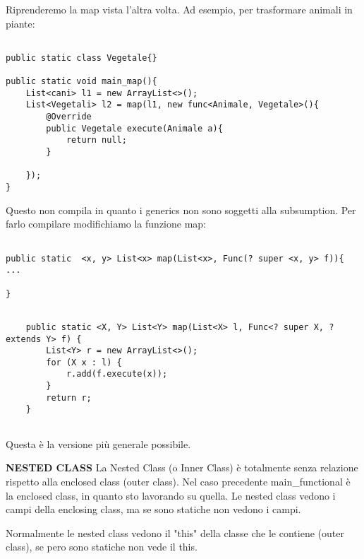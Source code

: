 \noindent Riprenderemo la map vista l'altra volta. Ad esempio, per trasformare animali in piante: 

\begin{lstlisting}[basicstyle=\small,]

public static class Vegetale{}

public static void main_map(){
	List<cani> l1 = new ArrayList<>();
	List<Vegetali> l2 = map(l1, new func<Animale, Vegetale>(){
		@Override
		public Vegetale execute(Animale a){
			return null;
		}
	
	});
}

\end{lstlisting}

\noindent Questo non compila in quanto i generics non sono soggetti alla subsumption. \newline
Per farlo compilare modifichiamo la funzione map: 

\begin{lstlisting}[basicstyle=\small,]

public static  <x, y> List<x> map(List<x>, Func(? super <x, y> f)){
...

}

\end{lstlisting}

\begin{lstlisting}[basicstyle=\small,]

    public static <X, Y> List<Y> map(List<X> l, Func<? super X, ? extends Y> f) {
        List<Y> r = new ArrayList<>();
        for (X x : l) {
            r.add(f.execute(x));
        }
        return r;
    }
    
\end{lstlisting}

Questa è la versione più generale possibile. \newline


\noindent \textbf{NESTED CLASS}\newline
La Nested Class (o Inner Class) è totalmente senza relazione rispetto alla enclosed class (outer class).\newline
Nel caso precedente main{\_}functional è la enclosed class, in quanto sto lavorando su quella. \newline
Le nested class vedono i campi della enclosing class, ma se sono statiche non vedono i campi. 


Normalmente le nested class vedono il "this" della classe che le contiene (outer class), se pero sono statiche non vede il this.






